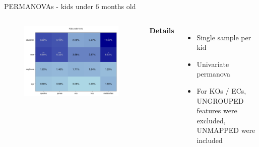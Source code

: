 \begin{frame}{PERMANOVAs - kids under 6 months old}
    \begin{columns}[c] %

    
        \begin{figure}
        \includegraphics[width=1\linewidth]{../figures/kids_under6mo_permanovas.png}
        \end{figure}

    
        \textbf{Details}
        \begin{itemize}
            \item Single sample per kid
            \item Univariate permanova
            \item For KOs / ECs, UNGROUPED features were excluded, UNMAPPED were included
        \end{itemize}

    \end{columns}

\end{frame}

